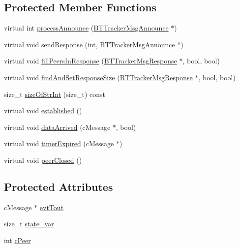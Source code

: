 \subsection*{Protected Member Functions}
\begin{DoxyCompactItemize}
\item 
virtual int \hyperlink{classBTTrackerClientHandlerBase_a08b80c81147a46c822974fc45a5abc03}{process\+Announce} (\hyperlink{classBTTrackerMsgAnnounce}{B\+T\+Tracker\+Msg\+Announce} $\ast$)
\item 
virtual void \hyperlink{classBTTrackerClientHandlerBase_a5866e5c45a061fe832b117eb7203021f}{send\+Response} (int, \hyperlink{classBTTrackerMsgAnnounce}{B\+T\+Tracker\+Msg\+Announce} $\ast$)
\item 
virtual void \hyperlink{classBTTrackerClientHandlerBase_ad736dafdf1a33bdc269cc095633aa525}{fill\+Peers\+In\+Response} (\hyperlink{classBTTrackerMsgResponse}{B\+T\+Tracker\+Msg\+Response} $\ast$, bool, bool)
\item 
virtual void \hyperlink{classBTTrackerClientHandlerBase_aab404299d6998b7e1d25bcd44797d203}{find\+And\+Set\+Response\+Size} (\hyperlink{classBTTrackerMsgResponse}{B\+T\+Tracker\+Msg\+Response} $\ast$, bool, bool)
\item 
size\+\_\+t \hyperlink{classBTTrackerClientHandlerBase_af3f5db2319771924d2768867d1e645f9}{size\+Of\+Str\+Int} (size\+\_\+t) const 
\item 
virtual void \hyperlink{classBTTrackerClientHandlerBase_a169bd0bce2bc7d184b968e49bc6af07a}{established} ()
\item 
virtual void \hyperlink{classBTTrackerClientHandlerBase_aade96a45939d0424c55c5285cacc2f51}{data\+Arrived} (c\+Message $\ast$, bool)
\item 
virtual void \hyperlink{classBTTrackerClientHandlerBase_aa5f6520bb9f47a19e5113de551639fcb}{timer\+Expired} (c\+Message $\ast$)
\item 
virtual void \hyperlink{classBTTrackerClientHandlerBase_a2fc1e4ee37fc117ac76ee1b0ed60627e}{peer\+Closed} ()
\end{DoxyCompactItemize}
\subsection*{Protected Attributes}
\begin{DoxyCompactItemize}
\item 
c\+Message $\ast$ \hyperlink{classBTTrackerClientHandlerBase_a8291f72257d451243e30b1a0b77ed1e6}{evt\+Tout}
\item 
size\+\_\+t \hyperlink{classBTTrackerClientHandlerBase_a1f5c8ad3f3fddc535e349468eb3ac526}{state\+\_\+var}
\item 
int \hyperlink{classBTTrackerClientHandlerBase_ae06f0ce4f1021ec9cc94f8900dac50b5}{c\+Peer}
\end{DoxyCompactItemize}


